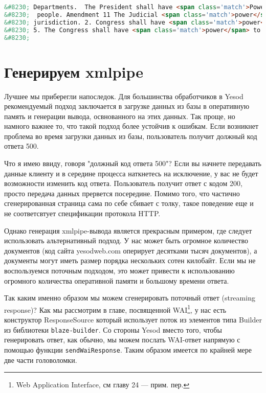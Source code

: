 \begin{lstlisting}[language=HTML] % TODO: перевести?
&#8230; Departments.  The President shall have <span class='match'>Power</span> to fill up all Vacancies
&#8230;  people. Amendment 11 The Judicial <span class='match'>power</span> of the United States shall
&#8230; jurisdiction. 2. Congress shall have <span class='match'>power</span> to enforce this article by
&#8230; 5. The Congress shall have <span class='match'>power</span> to enforce, by appropriate legislation
&#8230;
\end{lstlisting}

\section{Генерируем xmlpipe} %

Лучшее мы приберегли напоследок. Для большинства обработчиков в Yesod рекомендуемый подход заключается в загрузке данных из базы в оперативную память и генерации вывода, освнованного на этих данных. Так проще, но намного важнее то, что такой подход более устойчив к ошибкам.  Если возникнет проблема во время загрузки данных из базы, пользователь получит должный код ответа 500.

Что я имею ввиду, говоря "должный код ответа 500"? Если вы начнете передавать данные клиенту и в середине процесса наткнетесь на исключение, у вас не будет возможности изменить код ответа. Пользователь получит ответ с кодом 200, просто передача данных прервется посередине. Помимо того, что частично сгенерированная страница сама по себе сбивает с толку, такое поведение еще и не соответсвтует спецификации протокола HTTP.

Однако генерация xmlpipe-вывода является прекрасным примером, где следует использовать альтернативный подход. У нас может быть огромное количество документов (код сайта yesodweb.com оперирует десятками тысяч документов), а документы могут иметь размер порядка нескольких сотен килобайт. Если мы не воспользуемся поточным подходом, это может привести к использованию огромного количества оперативной памяти и большому времени ответа.

Так каким именно образом мы можем сгенерировать поточный ответ (streaming response)? Как мы рассмотрим в главе, посвященной WAI\footnote{Web Application Interface, см главу 24 --- прим. пер.}, у нас есть конструктор ResponseSource который использует поток из элементов типа Builder из библиотеки \lstinline'blaze-builder'. Со стороны Yesod вместо того, чтобы генерировать ответ, как обычно, мы можем послать WAI-ответ напрямую с помощью функции \lstinline'sendWaiResponse'. Таким образом имеется по крайней мере две части головоломки. %

